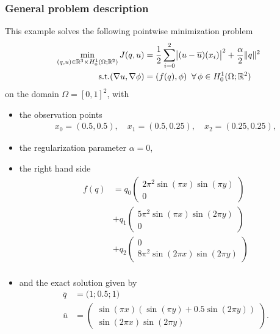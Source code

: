 \subsubsection{General problem description}
This example solves the following pointwise minimization problem
\begin{align*}
\min_{(q,u)\in \mathbb R^3 \times H_0^1(\Omega; \mathbb R^2)} J(q,u) &= \frac{1}{2} \sum_{i=0}^2\abs{(u-\overline u)(x_i)}^2 + \frac{\alpha}{2}\|q\|^2\\
\text{s.t.} (\nabla u,\nabla \phi) &= (f(q),\phi)\;\;\forall\,\phi \in H^1_0(\Omega; \mathbb R^2)
\end{align*}
on the domain $\Omega = [0,1]^2$, with
\begin{itemize}
\item the observation points
\begin{align*}
x_0 = (0.5, 0.5), \quad x_1 = (0.5, 0.25),\quad x_2 = (0.25, 0.25),
\end{align*}
\item the regularization parameter $\alpha = 0$, 
\item the right hand side
\begin{align*}
 f(q) &= q_0 \left(\begin{matrix}2\pi^2  \sin( \pi x) \sin(\pi y)\\0 \end{matrix}\right)\\
      &+ q_1 \left(\begin{matrix}5\pi^2  \sin( \pi x) \sin(2\pi y)\\0 \end{matrix}\right)\\
      &+ q_2 \left(\begin{matrix}0 \\8\pi^2  \sin(2\pi x) \sin(2\pi y)\end{matrix}\right)\\
\end{align*}
\item and the exact solution given by 
\begin{align*}
 \overline{q} &= \bigl(1;0.5;1\bigr)\\
 \overline{u}& = \left(\begin{matrix} \sin( \pi x)( \sin(\pi y)+0.5\sin(2\pi y))\\\sin(2\pi x) \sin(2\pi y) \end{matrix}\right).
\end{align*}
\end{itemize}
